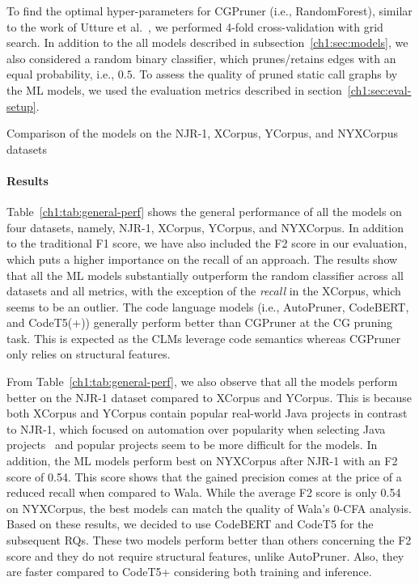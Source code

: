 To find the optimal hyper-parameters for CGPruner (i.e., RandomForest), similar to the work of Utture et al.~\cite{utture2022striking}, we performed 4-fold cross-validation with grid search. In addition to the all models described in subsection~\ref{ch1:sec:models}, we also considered a random binary classifier, which prunes/retains edges with an equal probability, i.e., $0.5$. To assess the quality of pruned static call graphs by the ML models, we used the evaluation metrics described in section~\ref{ch1:sec:eval-setup}.

\begin{table}
\centering
\caption{Comparison of the models on the NJR-1, XCorpus, YCorpus, and NYXCorpus datasets}
\label{ch1:tab:general-perf}

\end{table}

\paragraph{Results} Table~\ref{ch1:tab:general-perf} shows the general performance of all the models on four datasets, namely, NJR-1, XCorpus, YCorpus, and NYXCorpus.
In addition to the traditional F1 score, we have also included the F2 score in our evaluation, which puts a higher importance on the recall of an approach.
The results show that all the ML models substantially outperform the random classifier across all datasets and all metrics, with the exception of the \emph{recall} in the XCorpus, which seems to be an outlier.
The code language models (i.e., AutoPruner, CodeBERT, and CodeT5(+)) generally perform better than CGPruner at the CG pruning task.
This is expected as the CLMs leverage code semantics whereas CGPruner only relies on structural features.

From Table~\ref{ch1:tab:general-perf}, we also observe that all the models perform better on the NJR-1 dataset compared to XCorpus and YCorpus. This is because both XCorpus and YCorpus contain popular real-world Java projects in contrast to NJR-1, which focused on automation over popularity when selecting Java projects~\cite{palsberg2018njr} and popular projects seem to be more difficult for the models. In addition, the ML models perform best on NYXCorpus after NJR-1 with an F2 score of 0.54.
This score shows that the gained precision comes at the price of a reduced recall when compared to Wala.
While the average F2 score is only 0.54 on NYXCorpus, the best models can match the quality of Wala's 0-CFA analysis.
Based on these results, we decided to use CodeBERT and CodeT5 for the subsequent RQs.
These two models perform better than others concerning the F2 score and they do not require structural features, unlike AutoPruner. Also, they are faster compared to CodeT5+ considering both training and inference.


